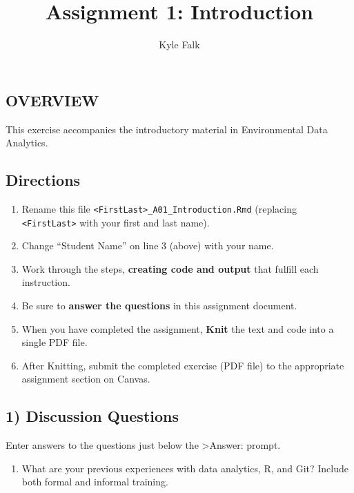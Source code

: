 \documentclass[
]{article}
\title{Assignment 1: Introduction}
\author{Kyle Falk}
\date{}
\providecommand{\tightlist}{%
  \setlength{\itemsep}{0pt}\setlength{\parskip}{0pt}}
\begin{document}
\maketitle

\subsection{OVERVIEW}\label{overview}

This exercise accompanies the introductory material in Environmental
Data Analytics.

\subsection{Directions}\label{directions}

\begin{enumerate}
\def\labelenumi{\arabic{enumi}.}
\tightlist
\item
  Rename this file
  \texttt{\textless{}FirstLast\textgreater{}\_A01\_Introduction.Rmd}
  (replacing \texttt{\textless{}FirstLast\textgreater{}} with your first
  and last name).
\item
  Change ``Student Name'' on line 3 (above) with your name.
\item
  Work through the steps, \textbf{creating code and output} that fulfill
  each instruction.
\item
  Be sure to \textbf{answer the questions} in this assignment document.
\item
  When you have completed the assignment, \textbf{Knit} the text and
  code into a single PDF file.
\item
  After Knitting, submit the completed exercise (PDF file) to the
  appropriate assignment section on Canvas.
\end{enumerate}

\subsection{1) Discussion Questions}\label{discussion-questions}

Enter answers to the questions just below the \textgreater Answer:
prompt.

\begin{enumerate}
\def\labelenumi{\arabic{enumi}.}
\tightlist
\item
  What are your previous experiences with data analytics, R, and Git?
  Include both formal and informal training.
\end{enumerate}
\end{document}

